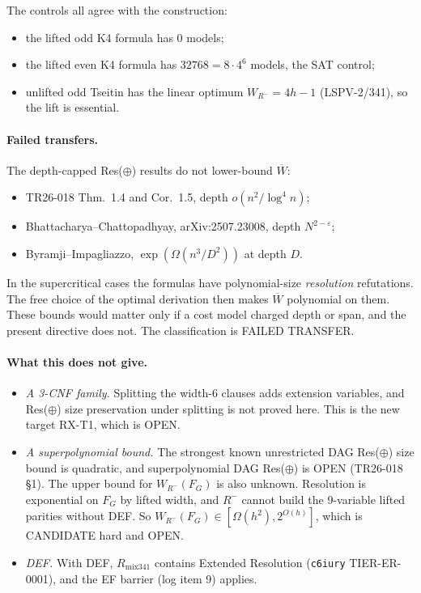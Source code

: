 \documentclass[11pt]{article}
\begin{document}
The controls all agree with the construction:
\begin{itemize}
\item the lifted odd K4 formula has 0 models;
\item the lifted even K4 formula has $32768=8\cdot4^6$ models, the SAT control;
\item unlifted odd Tseitin has the linear optimum $W_{R^-}=4h-1$ (LSPV-2/341), so the lift is essential.
\end{itemize}

\paragraph{Failed transfers.} The depth-capped Res($\oplus$) results do not lower-bound $\overline W$:
\begin{itemize}
\item TR26-018 Thm.~1.4 and Cor.~1.5, depth $o(n^2/\log^4 n)$;
\item Bhattacharya--Chattopadhyay, arXiv:2507.23008, depth $N^{2-\varepsilon}$;
\item Byramji--Impagliazzo, $\exp(\Omega(n^3/D^2))$ at depth $D$.
\end{itemize}
In the supercritical cases the formulas have polynomial-size \emph{resolution} refutations. The free choice of the optimal derivation then makes $\overline W$ polynomial on them. These bounds would matter only if a cost model charged depth or span, and the present directive does not. The classification is FAILED TRANSFER.

\paragraph{What this does not give.}
\begin{itemize}
\item[(i)] \emph{A 3-CNF family.} Splitting the width-6 clauses adds extension variables, and Res($\oplus$) size preservation under splitting is not proved here. This is the new target RX-T1, which is OPEN.
\item[(ii)] \emph{A superpolynomial bound.} The strongest known unrestricted DAG Res($\oplus$) size bound is quadratic, and superpolynomial DAG Res($\oplus$) is OPEN (TR26-018 \S1). The upper bound for $W_{R^-}(F_G)$ is also unknown. Resolution is exponential on $F_G$ by lifted width, and $R^-$ cannot build the 9-variable lifted parities without DEF. So $W_{R^-}(F_G)\in[\Omega(h^2),2^{O(h)}]$, which is CANDIDATE hard and OPEN.
\item[(iii)] \emph{DEF.} With DEF, $R_{\mathrm{mix341}}$ contains Extended Resolution (\texttt{c6iury} TIER-ER-0001), and the EF barrier (log item 9) applies.
\end{itemize}
\end{document}
